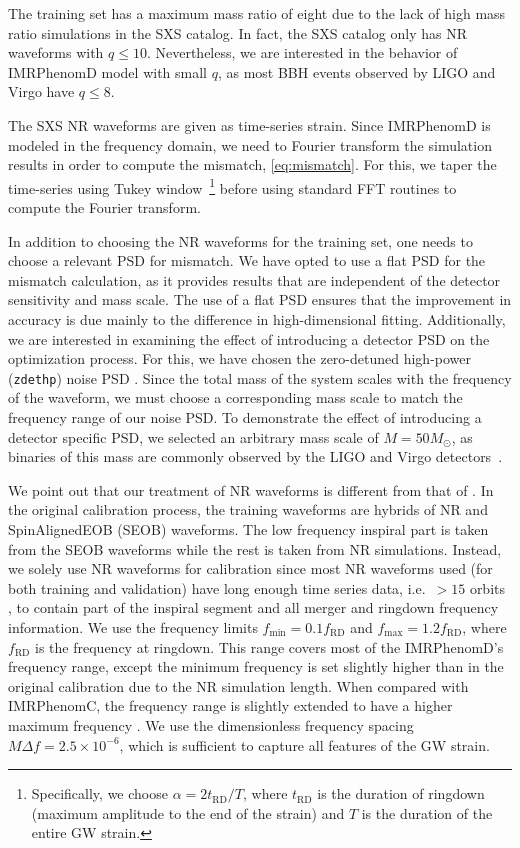 \documentclass[twocolumn]{aastex631}
\newcommand{\zdethp}{\texttt{zdethp}}
\newcommand{\te}[1]{{\color{rr}[TE: #1 ]}}
\begin{document}
The training set has a maximum mass ratio of eight due to the lack 
of high mass ratio simulations in the SXS catalog.
In fact, the SXS catalog only has NR waveforms with $q\leq10$.
Nevertheless, we are interested in the behavior of IMRPhenomD model with small $q$,
as most BBH events observed by LIGO and Virgo have $q\leq8$.

The SXS NR waveforms are given as time-series strain.
Since IMRPhenomD is modeled in the frequency domain, we need to Fourier transform the simulation results
in order to compute the mismatch, \eqref{eq:mismatch}.
For this, we taper the time-series using Tukey window~\citep{usman2016pycbc}\footnote{
	Specifically, we choose $\alpha=2t_{\mathrm{RD}}/T$, where
	$t_{\mathrm{RD}}$ is the duration of ringdown (maximum amplitude to the end of the strain) and $T$ is the duration of the
	entire GW strain. 
} before using standard FFT routines to compute the Fourier transform.

In addition to choosing the NR waveforms for the training set,
one needs to choose a relevant PSD for mismatch.
We have opted to use a flat PSD for the mismatch calculation,
as it provides results that are independent of the detector sensitivity and mass scale.
The use of a flat PSD ensures that the improvement in accuracy is due mainly
to the difference in high-dimensional fitting.
Additionally, we are interested in examining the effect of introducing a detector PSD
on the optimization process. For this, we have chosen the
zero-detuned high-power (\zdethp) noise PSD \citep{aasi2015advanced}.
Since the total mass of the system scales with the frequency of the waveform,
we must choose a corresponding mass scale to match the frequency range of our noise PSD.
To demonstrate the effect of introducing a detector specific PSD,
we selected an arbitrary mass scale of $M=50M_{\odot}$, as binaries
of this mass are commonly observed by the LIGO and Virgo detectors~\citep{gwtc1, gwtc2, gwtc21, gwtc3}.

We point out that our treatment of NR waveforms is different from that of \citep{husa2016frequency, khan2016frequency}.
In the original calibration process, the training waveforms are hybrids of NR and SpinAlignedEOB (SEOB) waveforms.
The low frequency inspiral part is taken from the SEOB
waveforms while the rest is taken from NR simulations.
Instead, we solely use NR waveforms for calibration since most NR waveforms used (for both training and validation)
have long enough time series data, i.e.~$>15$ orbits \citep{boyle2019sxs}, to contain part of the inspiral segment and all
merger and ringdown frequency information. We use the frequency limits
$f_{\mathrm{min}}=0.1f_{\mathrm{RD}}$ and $f_{\mathrm{max}}=1.2f_{\mathrm{RD}}$,	
where $f_{\mathrm{RD}}$ is the frequency at ringdown. This range covers most of
the IMRPhenomD's frequency range, except the minimum frequency is set slightly higher
than in the original calibration due to the NR simulation length.
When compared with IMRPhenomC, the frequency range is slightly extended to have a higher maximum
frequency \citep{santamaria2010matching}.
We use the dimensionless frequency spacing $M\Delta f=2.5\times10^{-6}$, 
which is sufficient to capture all features of the GW strain. 
\end{document}
